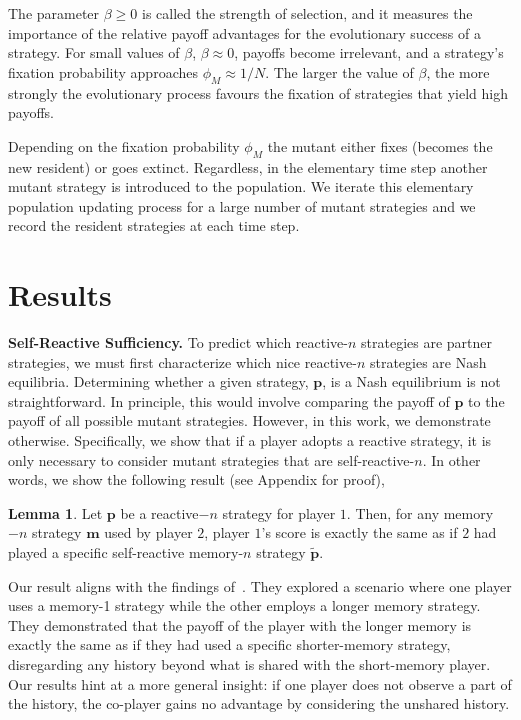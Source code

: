 \documentclass{article}
\theoremstyle{definition}
\newtheorem{lemma}[theorem]{Lemma}
\begin{document}
The parameter \(\beta \geq 0\) is called the strength of selection, and it
measures the importance of the relative payoff advantages for the
evolutionary success of a strategy. For small values of \(\beta\), \(\beta
\approx 0\), payoffs become irrelevant, and a strategy's fixation probability
approaches \(\phi_{M} \approx 1 / N\). The larger the value of \(\beta\), the
more strongly the evolutionary process favours the fixation of strategies that
yield high payoffs.

Depending on the fixation probability \(\phi_{M}\) the mutant either fixes
(becomes the new resident) or goes extinct. Regardless, in the elementary time
step another mutant strategy is introduced to the  population. We iterate this
elementary population updating process for a large number of mutant strategies
and we record the resident strategies at each time step.

\section{Results}

\textbf{Self-Reactive Sufficiency.} To predict which reactive-$n$ strategies are
partner strategies, we must first characterize which nice reactive-$n$
strategies are Nash equilibria. Determining whether a given strategy,
$\mathbf{p}$, is a Nash equilibrium is not straightforward. In principle, this
would involve comparing the payoff of $\mathbf{p}$ to the payoff of all possible
mutant strategies. However, in this work, we demonstrate otherwise.
Specifically, we show that if a player adopts a reactive strategy, it is only
necessary to consider mutant strategies that are self-reactive-$n$. In other
words, we show the following result (see Appendix for proof),

\begin{lemma}\label{lemma:self_reactive_sufficiency}
  Let $\mathbf{p}$ be a reactive$-n$ strategy for player $1$. Then, for any
  memory$-n$ strategy $\mathbf{m}$ used by player $2$, player $1$'s score is
  exactly the same as if $2$ had played a specific self-reactive memory-$n$
  strategy $\mathbf{\tilde{p}}$.
\end{lemma}

Our result aligns with the findings of~\cite{press:PNAS:2012}. They explored a
scenario where one player uses a memory-1 strategy while the other employs a
longer memory strategy. They demonstrated that the payoff of the player with the
longer memory is exactly the same as if they had used a specific shorter-memory
strategy, disregarding any history beyond what is shared with the short-memory
player. Our results hint at a more general insight: if one player does not
observe a part of the history, the co-player gains no advantage by considering
the unshared history.
\end{document}
